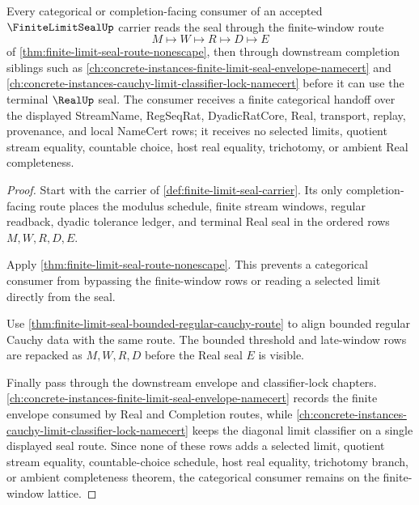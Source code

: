 \begin{theorem}
\label{thm:finite-limit-seal-category-consumer-route}
Every categorical or completion-facing consumer of an accepted $\FiniteLimitSealUp$ carrier reads the seal through the finite-window route
$$
M \longmapsto W \longmapsto R \longmapsto D \longmapsto E
$$
of \autoref{thm:finite-limit-seal-route-nonescape}, then through downstream completion siblings such as \autoref{ch:concrete-instances-finite-limit-seal-envelope-namecert} and \autoref{ch:concrete-instances-cauchy-limit-classifier-lock-namecert} before it can use the terminal $\RealUp$ seal. The consumer receives a finite categorical handoff over the displayed StreamName, RegSeqRat, DyadicRatCore, Real, transport, replay, provenance, and local NameCert rows; it receives no selected limits, quotient stream equality, countable choice, host real equality, trichotomy, or ambient Real completeness.
\end{theorem}
\begin{proof}
Start with the carrier of \autoref{def:finite-limit-seal-carrier}. Its only completion-facing route places the modulus schedule, finite stream windows, regular readback, dyadic tolerance ledger, and terminal Real seal in the ordered rows $M,W,R,D,E$.

Apply \autoref{thm:finite-limit-seal-route-nonescape}. This prevents a categorical consumer from bypassing the finite-window rows or reading a selected limit directly from the seal.

Use \autoref{thm:finite-limit-seal-bounded-regular-cauchy-route} to align bounded regular Cauchy data with the same route. The bounded threshold and late-window rows are repacked as $M,W,R,D$ before the Real seal $E$ is visible.

Finally pass through the downstream envelope and classifier-lock chapters. \autoref{ch:concrete-instances-finite-limit-seal-envelope-namecert} records the finite envelope consumed by Real and Completion routes, while \autoref{ch:concrete-instances-cauchy-limit-classifier-lock-namecert} keeps the diagonal limit classifier on a single displayed seal route. Since none of these rows adds a selected limit, quotient stream equality, countable-choice schedule, host real equality, trichotomy branch, or ambient completeness theorem, the categorical consumer remains on the finite-window lattice.
\end{proof}
